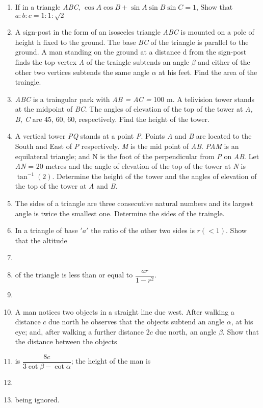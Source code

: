 \documentclass[journal,12pt,twocolumn]{IEEEtran}
\begin{document}
\begin{enumerate}
 \item If in a triangle \textsl{ABC}, $\cos A \cos B+\sin A \sin B \sin C = 1$, Show that $a:b:c = 1:1:\sqrt{2}$
 \item A sign-post in the form of an isosceles triangle \textsl{ABC} is mounted on a pole of height h fixed to the ground. The base \textsl{BC} of the triangle is parallel to the ground. A man standing on the ground at a distance d from the sign-post finds the top vertex \textsl{A} of the traingle subtends an angle $\beta$ and either of the other two vertices subtends the same angle $\alpha$ at his feet. Find the area of the traingle.
 \item \textsl{ABC} is a traingular park with \textsl{AB = AC = }100 m. A telivision tower stands at the midpoint of \textsl{BC}. The angles of elevation of the top of the tower at \textsl{A, B, C} are 45\degree, 60\degree, 60\degree, respectively. Find the height of the tower.
 \item A vertical tower \textsl{PQ} stands at a point \textsl{P}. Points \textsl{A} and \textsl{B} are located to the South and East of \textsl{P} respectively. \textsl{M} is the mid point of \textsl{AB}. \textsl{PAM} is an equilateral triangle; and N is the foot of the perpendicular from \textsl{P} on \textsl{AB}. Let \textsl{AN} = 20 metres and the angle of elevation of the top of the tower at \textsl{N} is $\tan^{-1}\left(2\right)$. Determine the height of the tower and the angles of elevation of the top of the tower at \textsl{A} and \textsl{B}.
 \item The sides of a triangle are three consecutive natural numbers and its largest angle is twice the smallest one. Determine the sides of the traingle.
 \item In a triangle of base $'a'$ the ratio of the other two sides is $r\left(<1\right)$. Show that the altitude \item[~] \item[~] of the triangle is less than or equal to $\dfrac{ar}{1-r^2}$. \item[~] 
 \item A man notices two objects in a straight line due west. After walking a distance $c$ due north he observes that the objects subtend an angle $\alpha$, at his eye; and, after walking a further distance 2$c$ due north, an angle $\beta$. Show that the distance between the objects \item[~]is $\dfrac{8c}{3\cot\beta-\cot\alpha}$; the height of the man is \item[~]\item[~]being ignored.

\end{enumerate}
\end{document}
